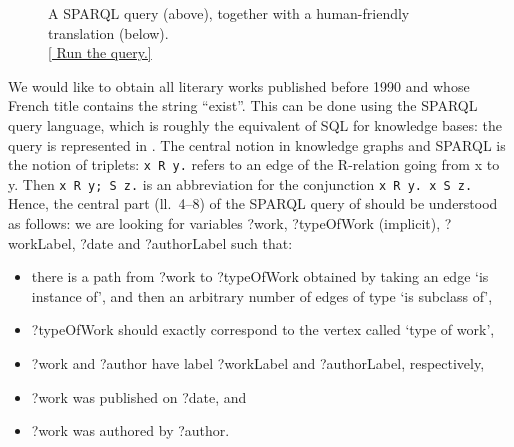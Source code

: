 \begin{figure}
	
	
	\caption{
		\label{fig:sparql}
		A SPARQL query (above), together with a human-friendly translation (below).\\
	\href{https://query.wikidata.org/\#SELECT\%20DISTINCT\%20\%3Fwork\%20\%3FworkLabel\%20\%3FauthorLabel\%0AWHERE\%0A\%7B\%0A\%20\%20\%3Fwork\%09wdt\%3AP31\%2Fwdt\%3AP279\%2a\%20wd\%3AQ7725634\%3B\%0A\%20\%20\%20\%20\%20\%20\%20\%20rdfs\%3Alabel\%20\%3FworkLabel\%3B\%0A\%20\%20\%09\%09wdt\%3AP577\%20\%3Fdate\%3B\%0A\%20\%20\%20\%20\%20\%20\%20\%20wdt\%3AP50\%20\%3Fauthor.\%0A\%20\%20\%3Fauthor\%20rdfs\%3Alabel\%20\%3FauthorLabel.\%0A\%20\%20FILTER\%28LANG\%28\%3FworkLabel\%29\%20\%3D\%20\%22fr\%22\%20\%26\%26\%20LANG\%28\%3FauthorLabel\%29\%20\%3D\%20\%22fr\%22\%29.\%0A\%20\%20FILTER\%28CONTAINS\%28\%3FworkLabel\%2C\%20\%22exist\%22\%29\%29.\%0A\%20\%20FILTER\%28YEAR\%28\%3Fdate\%29\%20\%3C\%3D\%201990\%29.\%0A\%7D\%0ALIMIT\%207}{[\raisebox{-.4ex}{\HandRight} Run the query.]}
	}
\end{figure}
We would like to obtain all literary works published before 1990 and whose
French title contains the string ``exist''.
This can be done using the SPARQL query language, which is roughly the equivalent
of SQL for knowledge bases: the query is represented in .
The central notion in knowledge graphs and SPARQL is the notion of triplets:
\lstinline[language=SQL]{x R y.} refers to an edge of the \textsf{R}-relation
going from \textsf{x} to \textsf{y}.
Then \lstinline[language=SQL]{x R y; S z.} is an abbreviation for
the conjunction \lstinline[language=SQL]{x R y. x S z.}
Hence, the central part (ll.~4--8) of the SPARQL query of 
should be understood as follows:
we are looking for variables \textsf{?work}, \textsf{?typeOfWork} (implicit),
\textsf{?workLabel}, \textsf{?date} and \textsf{?authorLabel} such that:
\begin{itemize}
	\item there is a path from \textsf{?work} to \textsf{?typeOfWork}
		obtained by taking an edge `is instance of', and then an arbitrary number
		of edges of type `is subclass of',
	\item \textsf{?typeOfWork} should exactly correspond to the vertex called `type of work',
	\item \textsf{?work} and \textsf{?author} have label \textsf{?workLabel} and \textsf{?authorLabel}, respectively, 
	\item \textsf{?work} was published on \textsf{?date}, and
	\item \textsf{?work} was authored by \textsf{?author}.
\end{itemize}
